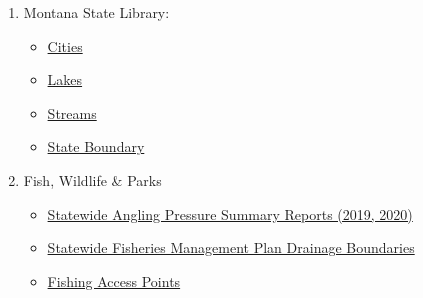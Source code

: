 \documentclass[11pt]{article}
\providecommand{\tightlist}{%
      \setlength{\itemsep}{0pt}\setlength{\parskip}{0pt}}
\begin{document}
\begin{enumerate}
\def\labelenumi{\arabic{enumi}.}
\tightlist
\item
  Montana State Library:

  \begin{itemize}
  \tightlist
  \item
    \href{https://msl.mt.gov/geoinfo/msdi/administrative_boundaries/}{Cities}
  \item
    \href{https://msl.mt.gov/geoinfo/water_information_system/nhd_high_resolution_data_download}{Lakes}
  \item
    \href{https://msl.mt.gov/geoinfo/water_information_system/nhd_high_resolution_data_download}{Streams}
  \item
    \href{https://msl.mt.gov/geoinfo/msdi/administrative_boundaries/}{State
    Boundary}
  \end{itemize}
\item
  Fish, Wildlife \& Parks

  \begin{itemize}
  \tightlist
  \item
    \href{https://fwp.mt.gov/fish/pressure-surveys}{Statewide Angling
    Pressure Summary Reports (2019, 2020)}
  \item
    \href{https://fwp-gis.mt.gov/arcgis/rest/services/fish/fishViewer/MapServer/66}{Statewide
    Fisheries Management Plan Drainage Boundaries}
  \item
    \href{https://gis-mtfwp.hub.arcgis.com/datasets/40c5d0eafa9343249239b71cbd4e95b6_0/explore?location=46.831007\%2C-109.511871\%2C6}{Fishing
    Access Points}
  \end{itemize}
\end{enumerate}
\end{document}
